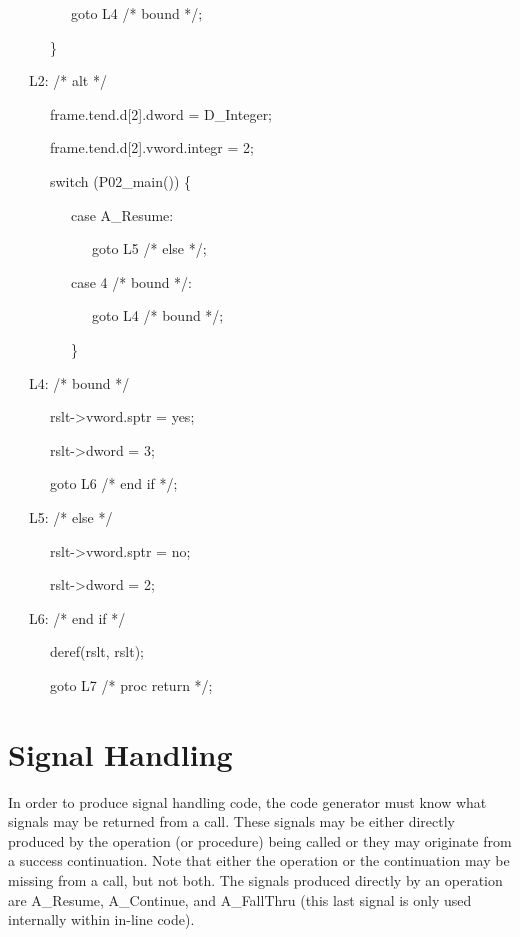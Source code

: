 {\ttfamily\mdseries
\ \ \ \ \ \ \ \ \ goto L4 /* bound */;}

{\ttfamily\mdseries
\ \ \ \ \ \ \}}

{\ttfamily\mdseries
\ \ \ L2: /* alt */}

{\ttfamily\mdseries
\ \ \ \ \ \ frame.tend.d[2].dword = D\_Integer;}

{\ttfamily\mdseries
\ \ \ \ \ \ frame.tend.d[2].vword.integr = 2;}

{\ttfamily\mdseries
\ \ \ \ \ \ switch (P02\_main()) \{}

{\ttfamily\mdseries
\ \ \ \ \ \ \ \ \ case A\_Resume:}

{\ttfamily\mdseries
\ \ \ \ \ \ \ \ \ \ \ \ goto L5 /* else */;}

{\ttfamily\mdseries
\ \ \ \ \ \ \ \ \ case 4 /* bound */:}

{\ttfamily\mdseries
\ \ \ \ \ \ \ \ \ \ \ \ goto L4 /* bound */;}

{\ttfamily\mdseries
\ \ \ \ \ \ \ \ \ \}}

{\ttfamily\mdseries
\ \ \ L4: /* bound */}

{\ttfamily\mdseries
\ \ \ \ \ \ rslt-{\textgreater}vword.sptr = yes;}

{\ttfamily\mdseries
\ \ \ \ \ \ rslt-{\textgreater}dword = 3;}

{\ttfamily\mdseries
\ \ \ \ \ \ goto L6 /* end if */;}


\bigskip

{\ttfamily\mdseries
\ \ \ L5: /* else */}

{\ttfamily\mdseries
\ \ \ \ \ \ rslt-{\textgreater}vword.sptr = no;}

{\ttfamily\mdseries
\ \ \ \ \ \ rslt-{\textgreater}dword = 2;}

{\ttfamily\mdseries
\ \ \ L6: /* end if */}

{\ttfamily\mdseries
\ \ \ \ \ \ deref(rslt, rslt);}

{\ttfamily\mdseries
\ \ \ \ \ \ goto L7 /* proc return */;}


\section{Signal Handling}

In order to produce signal handling code, the code generator must know
what signals may be returned from a call. These signals may be either
directly produced by the operation (or procedure) being called or they
may originate from a success continuation. Note that either the
operation or the continuation may be missing from a call, but not
both. The signals produced directly by an operation are A\_Resume,
A\_Continue, and A\_FallThru (this last signal is only used internally
within in-line code).

